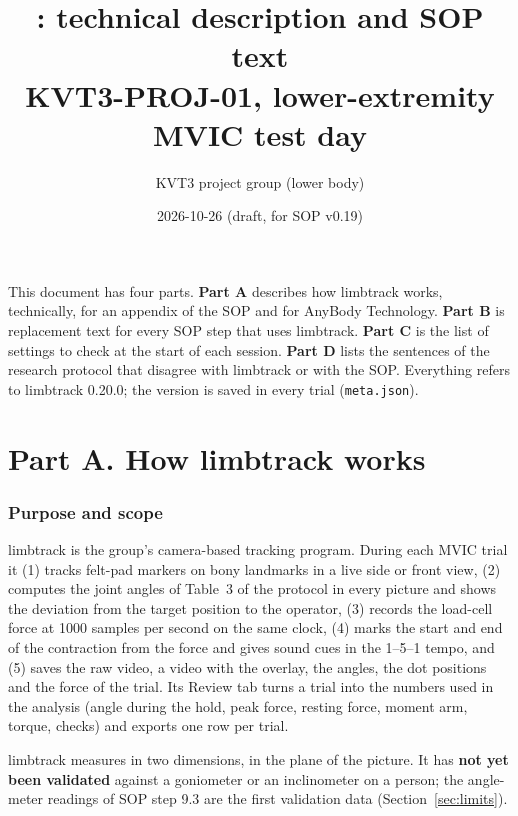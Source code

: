 \documentclass[a4paper,10pt]{article}
\title{\lt{} \ltversion: technical description and SOP text\\[2pt]\large KVT3-PROJ-01, lower-extremity MVIC test day}
\author{KVT3 project group (lower body)}
\date{2026-10-26 (draft, for SOP v0.19)}
\newcommand{\lt}{\textsf{limbtrack}}
\newcommand{\ltversion}{0.20.0}
\newcommand{\code}[1]{\texttt{#1}}
\begin{document}
\maketitle

\noindent This document has four parts. \textbf{Part A} describes how \lt{} works, technically, for an appendix of the SOP and for
AnyBody Technology. \textbf{Part B} is replacement text for every SOP step that uses \lt{}. \textbf{Part C} is the list of settings to
check at the start of each session. \textbf{Part D} lists the sentences of the research protocol that disagree with \lt{} or with the SOP.
Everything refers to \lt{} \ltversion; the version is saved in every trial (\code{meta.json}).

\tableofcontents

\part*{Part A. How \lt{} works}

\section{Purpose and scope}
\lt{} is the group's camera-based tracking program. During each MVIC trial it (1) tracks felt-pad markers on bony landmarks in a live
side or front view, (2) computes the joint angles of Table~3 of the protocol in every picture and shows the deviation from the target
position to the operator, (3) records the load-cell force at 1000 samples per second on the same clock, (4) marks the start and end of the
contraction from the force and gives sound cues in the 1--5--1 tempo, and (5) saves the raw video, a video with the overlay, the angles,
the dot positions and the force of the trial. Its Review tab turns a trial into the numbers used in the analysis (angle during the hold,
peak force, resting force, moment arm, torque, checks) and exports one row per trial.

\lt{} measures in two dimensions, in the plane of the picture. It has \textbf{not yet been validated} against a goniometer or an
inclinometer on a person; the angle-meter readings of SOP step 9.3 are the first validation data (Section~\ref{sec:limits}).
\end{document}
